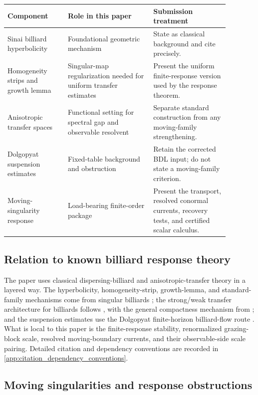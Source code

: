 \documentclass[11pt]{amsart}
\theoremstyle{compactplain}
\theoremstyle{compactdefinition}
\theoremstyle{compactremark}
\begin{document}
\begin{center}
\small
\begin{tabular}{p{0.24\linewidth}p{0.34\linewidth}p{0.30\linewidth}}
\hline
Component & Role in this paper & Submission treatment \\
\hline
Sinai billiard hyperbolicity & Foundational geometric mechanism &
State as classical background and cite precisely. \\
Homogeneity strips and growth lemma & Singular-map regularization needed for
uniform transfer estimates & Present the uniform finite-response version used
by the response theorem. \\
Anisotropic transfer spaces & Functional setting for spectral gap and
observable resolvent & Separate standard construction from any moving-family
strengthening. \\
Dolgopyat suspension estimates & Fixed-table background and obstruction &
Retain the corrected BDL input; do not state a moving-family criterion. \\
Moving-singularity response & Load-bearing finite-order package & Present the
transport, resolved conormal currents, recovery tests, and certified scalar
calculus. \\
\hline
\end{tabular}
\end{center}

\subsection{Relation to known billiard response theory}

The paper uses classical dispersing-billiard and anisotropic-transfer theory in
a layered way.  The hyperbolicity, homogeneity-strip, growth-lemma, and
standard-family mechanisms come from singular billiards
\cite{Sinai1970,KatokStrelcyn1986,chernov2006chaotic,ChernovZhang2009}; the
strong/weak transfer architecture for billiards follows
\cite{DemersZhang2011,DemersZhang2013}, with the general compactness mechanism
from \cite{Hennion1993,Baladi2000};
and the suspension estimates use the Dolgopyat finite-horizon billiard-flow
route \cite{Dolgopyat1998,BaladiDemersLiverani2018}.  What is local to this
paper is the finite-response stability, renormalized grazing-block scale, resolved
moving-boundary currents, and their observable-side scale pairing.
Detailed citation and dependency conventions are recorded in
\cref{app:citation_dependency_conventions}.

\subsection{Moving singularities and response obstructions}
\end{document}
